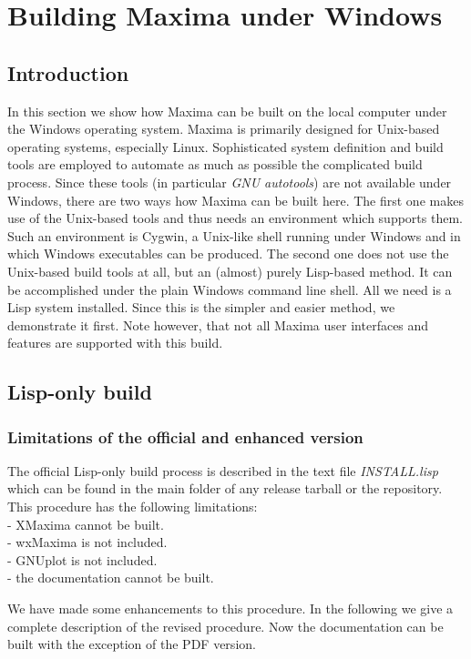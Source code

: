 \documentclass[../Maxima_Workbook.tex]{subfiles}
\begin{document}
\chapter{Building Maxima under Windows}\label{BW1}

\section{Introduction}

In this section we show how Maxima can be built on the local computer under the Windows operating system. Maxima is primarily designed for Unix-based operating systems, especially Linux. Sophisticated system definition and build tools are employed to automate as much as possible the complicated build process. Since these tools (in particular \emph{GNU autotools}) are not available under Windows, there are two ways how Maxima can be built here. The first one makes use of the Unix-based tools and thus needs an environment which supports them. Such an environment is Cygwin, a Unix-like shell running under Windows and in which Windows executables can be produced. The second one does not use the Unix-based build tools at all, but an (almost) purely Lisp-based method. It can be accomplished under the plain Windows command line shell. All we need is a Lisp system installed. Since this is the simpler and easier method, we demonstrate it first. Note however, that not all Maxima user interfaces and features are supported with this build.

\section{Lisp-only build}

\subsection{Limitations of the official and enhanced version}

The official Lisp-only build process is described in the text file \emph{INSTALL.lisp} which can be found in the main folder of any release tarball or the repository. This procedure has the following limitations: \\
- XMaxima cannot be built. \\
- wxMaxima is not included. \\
- GNUplot is not included. \\
- the documentation cannot be built.
 
\lz We have made some enhancements to this procedure. In the following we give a complete description of the revised procedure. Now the documentation can be built with the exception of the PDF version.
\end{document}
